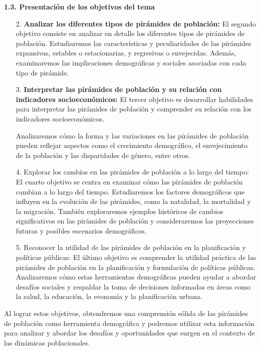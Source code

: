\documentclass[8pt,a4paper]{beamer}
\begin{document}
{\begin{frame}{}
\begin{block}{\textbf{1.3. Presentación de los objetivos del tema}}
\begin{enumerate}
\item[2.] \textbf{Analizar los diferentes tipos de pirámides de población:} El segundo objetivo consiste en analizar en detalle los diferentes tipos de pirámides de población. Estudiaremos las características y peculiaridades de las pirámides expansivas, estables o estacionarias, y regresivas o envejecidas. Además, examinaremos las implicaciones demográficas y sociales asociadas con cada tipo de pirámide.

\item[3.] \textbf{Interpretar las pirámides de población y su relación con indicadores socioeconómicos:} El tercer objetivo es desarrollar habilidades para interpretar las pirámides de población y comprender su relación con los indicadores socioeconómicos. 

\end{enumerate}
\end{block}

\end{frame}


\begin{frame}{}
\begin{block}{}
\justifying

\begin{enumerate}
\justifying
\item[{}] Analizaremos cómo la forma y las variaciones en las pirámides de población pueden reflejar aspectos como el crecimiento demográfico, el envejecimiento de la población y las disparidades de género, entre otros.

\item[4.] Explorar los cambios en las pirámides de población a lo largo del tiempo: El cuarto objetivo se centra en examinar cómo las pirámides de población cambian a lo largo del tiempo. Estudiaremos los factores demográficos que influyen en la evolución de las pirámides, como la natalidad, la mortalidad y la migración. También exploraremos ejemplos históricos de cambios significativos en las pirámides de población y consideraremos las proyecciones futuras y posibles escenarios demográficos.

\item[5.] Reconocer la utilidad de las pirámides de población en la planificación y políticas públicas: El último objetivo es comprender la utilidad práctica de las pirámides de población en la planificación y formulación de políticas públicas. Analizaremos cómo estas herramientas demográficas pueden ayudar a abordar desafíos sociales y respaldar la toma de decisiones informadas en áreas como la salud, la educación, la economía y la planificación urbana.
\end{enumerate}
Al lograr estos objetivos, obtendremos una comprensión sólida de las pirámides de población como herramienta demográfica y podremos utilizar esta información para analizar y abordar los desafíos y oportunidades que surgen en el contexto de las dinámicas poblacionales.
\end{block}


\end{frame}}
\end{document}
